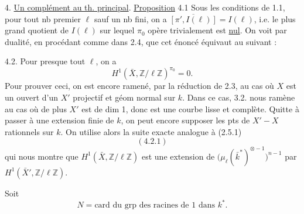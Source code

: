 4. \uline{Un complément au th. principal}.
\uline{Proposition} 4.1 Sous les conditions de 1.1, pour tout \deleted{\unsure{$\ell$}} nb premier $\ell$ sauf un nb fini,  \deleted{\unsure{$\pi$}} on a $\overline{[\pi',I(\ell)]}=I(\ell)$, i.e. le plus grand quotient  de $I(\ell)$ sur lequel $\pi_0$ opère trivialement est \uline{nul}.
On voit par dualité, en procédant comme dans 2.4, que cet énoncé équivaut au suivant :

  4.2. Pour presque tout $\ell$, on a
\[H^1(\bar X,\mathbb Z/\ell\mathbb Z)^{\pi_0}=0.\]
Pour prouver ceci, on est encore ramené,    par la réduction de 2.3, au cas où  $X$ est un ouvert d'un $X'$ projectif et géom normal sur $k$. Dans ce cas,  3.2. nous ramène au cas où de plus $X'$ est de dim 1, donc est une courbe lisse et complète.
Quitte à  passer à une extension finie de $k$, on peut encore supposer les pts  de $X'-X$ rationnels sur $k$. On utilise alors la suite exacte analogue à (2.5.1)
\[(4.2.1)\]
qui nous montre que $H^1(\bar X,\mathbb Z/\ell\mathbb Z)$ est une extension de $\bigl(\mu_\ell(\bar k^*)^{\otimes-1}\bigr)^{n-1}$ par $H^1(\bar X',\mathbb Z/\ell\mathbb Z)$.

 Soit
\[N=\text{card du grp des racines de 1 dans }k^*.\tag*{(4.2.2)}\]
